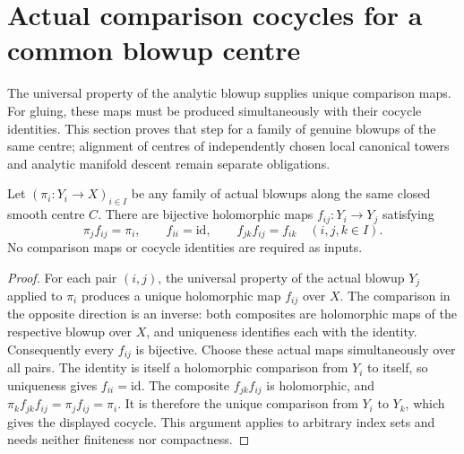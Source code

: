 \section{Actual comparison cocycles for a common blowup centre}

The universal property of the analytic blowup supplies unique comparison maps.
For gluing, these maps must be produced simultaneously with their cocycle
identities. This section proves that step for a family of genuine blowups of
the same centre; alignment of centres of independently chosen local canonical
towers and analytic manifold descent remain separate obligations.

\begin{theorem}
\label{hir:actual-blowup-comparison-cocycle}
\leanok
Let $(\pi_i:Y_i\to X)_{i\in I}$ be any family of actual blowups along the
same closed smooth centre $C$. There are bijective holomorphic maps
$f_{ij}:Y_i\to Y_j$ satisfying
\[
 \pi_j f_{ij}=\pi_i,\qquad f_{ii}=\mathrm{id},\qquad
 f_{jk}f_{ij}=f_{ik}\quad(i,j,k\in I).
\]
No comparison maps or cocycle identities are required as inputs.
\end{theorem}
\begin{proof}
For each pair $(i,j)$, the universal property of the actual blowup $Y_j$
applied to $\pi_i$ produces a unique holomorphic map $f_{ij}$ over $X$.
The comparison in the opposite direction is an inverse: both composites
are holomorphic maps of the respective blowup over $X$, and uniqueness
identifies each with the identity. Consequently every $f_{ij}$ is bijective.
Choose these actual maps simultaneously over all pairs. The identity is
itself a holomorphic comparison from $Y_i$ to itself, so uniqueness gives
$f_{ii}=\mathrm{id}$. The composite $f_{jk}f_{ij}$ is holomorphic, and
$\pi_k f_{jk}f_{ij}=\pi_j f_{ij}=\pi_i$. It is therefore the unique
comparison from $Y_i$ to $Y_k$, which gives the displayed cocycle. This
argument applies to arbitrary index sets and needs neither finiteness nor
compactness.
\end{proof}

